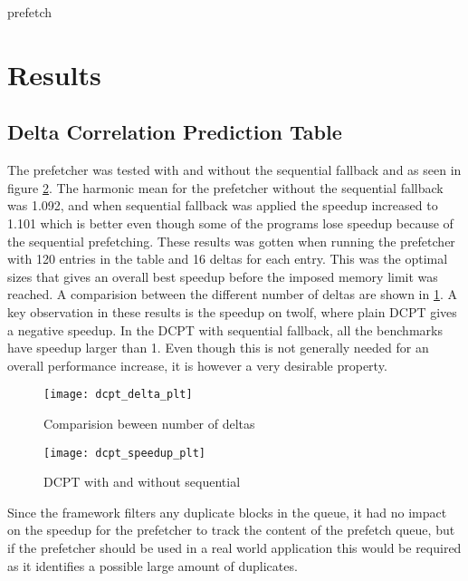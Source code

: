 \documentclass[12pt,journal,compsoc]{IEEEtran}
\begin{document}
\begin{algorithm}
\dontprintsemicolon
{}

\caption{prefetch\label{pre}}
\end{algorithm}

\section{Results}
\subsection{Delta Correlation Prediction Table}
The prefetcher was tested with and without the sequential fallback and as seen in figure \ref{fig:dcptspeed}. The harmonic mean for the prefetcher without the sequential fallback was 1.092, and when sequential fallback was applied the speedup increased to 1.101 which is better even though some of the programs lose speedup because of the sequential prefetching. These results was gotten when running the prefetcher with 120 entries in the table and 16 deltas for each entry. This was the optimal sizes that gives an overall best speedup before the
imposed memory limit was reached. A comparision between the different number of deltas are shown in \ref{fig:deltas}.
A key observation in these results is the speedup on twolf, where plain DCPT gives a negative speedup. In the DCPT with sequential fallback, all the benchmarks have speedup larger than 1. Even though this is not generally needed for
an overall performance increase, it is however a very desirable property.

\begin{figure}
\begin{center}
\texttt{[image: dcpt\_delta\_plt]}
\end{center}
\caption{\label{fig:deltas} Comparision beween number of deltas}
\end{figure}


\begin{figure}
\begin{center}
\texttt{[image: dcpt\_speedup\_plt]}
\end{center}
\caption{\label{fig:dcptspeed} DCPT with and without sequential}
\end{figure}

Since the framework filters any duplicate blocks in the queue,
it had no impact on the speedup for the prefetcher to track the content of
the prefetch queue, but if the prefetcher should be used in a real world
application this would be required as it identifies a possible large amount
of duplicates.
\end{document}
